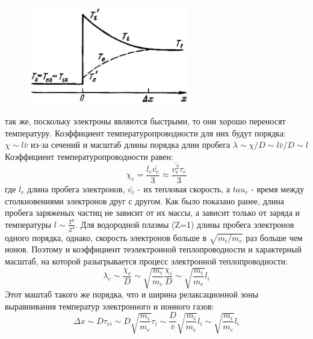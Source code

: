 \documentclass[10pt, a4paper]{article}
\begin{document}
\begin{figure}[ht]
	\begin{center}
		\includegraphics[width=70mm]{13. Skach plotn.JPG}
	\end{center}
\end{figure}

так же, поскольку электроны являются быстрыми, то они хорошо переносят температуру. Коэффициент температуропроводности для них будут порядка: $\chi \sim l\bar{v}$ из-за сечений и масштаб длины порядка длин пробега $\lambda \sim \chi /D \sim l \bar{v}/D \sim l$
Коэффициент температуропроводности равен:
\begin{equation}
	\chi_e=\frac{l_e \bar{v_e}}{3} \approx \frac{\bar{v_e^{2}} \tau_e}{3}
\end{equation} 
где $l_e$ длина пробега электронов, $\bar{v_e}$ - их тепловая скорость, а $tau_e$ - время между столкновениями электронов друг с другом.
Как было показано ранее, длина пробега заряженых частиц не зависит от их массы, а зависит только от заряда и температуры $l \sim \frac{T^{2}}{Z^{4}}$. Для водородной плазмы (Z=1) длины пробега электронов одного порядка, однако, скорость электронов больше в $\sqrt{m_i / m_e}$ раз больше чем ионов. Поэтому и коэффициент теэлектронной теплопроводности и характерный масштаб, на которой разыгрывается процесс электронной теплопроводности:
\begin{equation}
	\lambda_e \sim \frac{\chi_e}{D} \sim \sqrt{\frac{m_i}{m_e}} \frac{\chi_i}{D} \sim \sqrt{\frac{m_i}{m_e}} l_i
\end{equation}
Этот маштаб такого же порядка, что и ширина релаксационной зоны выравнивания температур электронного и ионного газов:
\begin{equation}
	\Delta x \sim D \tau_{ei} \sim D \sqrt{\frac{m_i}{m_e}} \tau_i \sim \frac{D}{\bar{v}} \sqrt{\frac{m_i}{m_e}} l_i \sim \sqrt{\frac{m_i}{m_e}} l_i
\end{equation}
\end{document}
